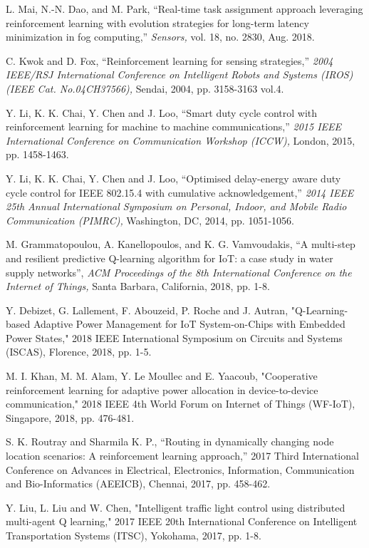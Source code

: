 \documentclass[journal]{IEEEtran}
\begin{document}
\begin{thebibliography}{1}
L. Mai, N.-N. Dao, and M. Park, ``Real-time task assignment approach leveraging reinforcement learning with evolution strategies for long-term latency minimization in fog computing,'' \emph{Sensors,} vol. 18, no. 2830, Aug. 2018.

C. Kwok and D. Fox, ``Reinforcement learning for sensing strategies,'' \emph{2004 IEEE/RSJ International Conference on Intelligent Robots and Systems (IROS) (IEEE Cat. No.04CH37566),} Sendai, 2004, pp. 3158-3163 vol.4.

Y. Li, K. K. Chai, Y. Chen and J. Loo, ``Smart duty cycle control with reinforcement learning for machine to machine communications,'' \emph{2015 IEEE International Conference on Communication Workshop (ICCW),} London, 2015, pp. 1458-1463.

Y. Li, K. K. Chai, Y. Chen and J. Loo, ``Optimised delay-energy aware duty cycle control for IEEE 802.15.4 with cumulative acknowledgement,'' \emph{2014 IEEE 25th Annual International Symposium on Personal, Indoor, and Mobile Radio Communication (PIMRC),} Washington, DC, 2014, pp. 1051-1056.

M. Grammatopoulou, A. Kanellopoulos, and K. G. Vamvoudakis, ``A multi-step and resilient predictive Q-learning algorithm for IoT: a case study in water supply networks'', \emph{ACM Proceedings of the 8th International Conference on the Internet of Things,} Santa Barbara, California, 2018, pp. 1-8.

Y. Debizet, G. Lallement, F. Abouzeid, P. Roche and J. Autran, "Q-Learning-based Adaptive Power Management for IoT System-on-Chips with Embedded Power States," 2018 IEEE International Symposium on Circuits and Systems (ISCAS), Florence, 2018, pp. 1-5.

M. I. Khan, M. M. Alam, Y. Le Moullec and E. Yaacoub, "Cooperative reinforcement learning for adaptive power allocation in device-to-device communication," 2018 IEEE 4th World Forum on Internet of Things (WF-IoT), Singapore, 2018, pp. 476-481.

S. K. Routray and Sharmila K. P., ``Routing in dynamically changing node location scenarios: A reinforcement learning approach,'' 2017 Third International Conference on Advances in Electrical, Electronics, Information, Communication and Bio-Informatics (AEEICB), Chennai, 2017, pp. 458-462.

Y. Liu, L. Liu and W. Chen, "Intelligent traffic light control using distributed multi-agent Q learning," 2017 IEEE 20th International Conference on Intelligent Transportation Systems (ITSC), Yokohama, 2017, pp. 1-8.


\end{thebibliography}
\end{document}
